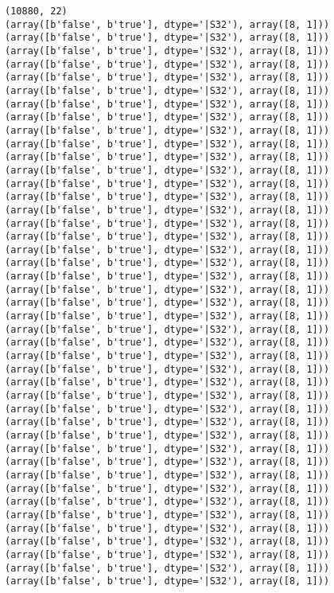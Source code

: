 \documentclass[11pt]{article}
\begin{document}
    \begin{Verbatim}[commandchars=\\\{\}]
(10880, 22)
(array([b'false', b'true'], dtype='|S32'), array([8, 1]))
(array([b'false', b'true'], dtype='|S32'), array([8, 1]))
(array([b'false', b'true'], dtype='|S32'), array([8, 1]))
(array([b'false', b'true'], dtype='|S32'), array([8, 1]))
(array([b'false', b'true'], dtype='|S32'), array([8, 1]))
(array([b'false', b'true'], dtype='|S32'), array([8, 1]))
(array([b'false', b'true'], dtype='|S32'), array([8, 1]))
(array([b'false', b'true'], dtype='|S32'), array([8, 1]))
(array([b'false', b'true'], dtype='|S32'), array([8, 1]))
(array([b'false', b'true'], dtype='|S32'), array([8, 1]))
(array([b'false', b'true'], dtype='|S32'), array([8, 1]))
(array([b'false', b'true'], dtype='|S32'), array([8, 1]))
(array([b'false', b'true'], dtype='|S32'), array([8, 1]))
(array([b'false', b'true'], dtype='|S32'), array([8, 1]))
(array([b'false', b'true'], dtype='|S32'), array([8, 1]))
(array([b'false', b'true'], dtype='|S32'), array([8, 1]))
(array([b'false', b'true'], dtype='|S32'), array([8, 1]))
(array([b'false', b'true'], dtype='|S32'), array([8, 1]))
(array([b'false', b'true'], dtype='|S32'), array([8, 1]))
(array([b'false', b'true'], dtype='|S32'), array([8, 1]))
(array([b'false', b'true'], dtype='|S32'), array([8, 1]))
(array([b'false', b'true'], dtype='|S32'), array([8, 1]))
(array([b'false', b'true'], dtype='|S32'), array([8, 1]))
(array([b'false', b'true'], dtype='|S32'), array([8, 1]))
(array([b'false', b'true'], dtype='|S32'), array([8, 1]))
(array([b'false', b'true'], dtype='|S32'), array([8, 1]))
(array([b'false', b'true'], dtype='|S32'), array([8, 1]))
(array([b'false', b'true'], dtype='|S32'), array([8, 1]))
(array([b'false', b'true'], dtype='|S32'), array([8, 1]))
(array([b'false', b'true'], dtype='|S32'), array([8, 1]))
(array([b'false', b'true'], dtype='|S32'), array([8, 1]))
(array([b'false', b'true'], dtype='|S32'), array([8, 1]))
(array([b'false', b'true'], dtype='|S32'), array([8, 1]))
(array([b'false', b'true'], dtype='|S32'), array([8, 1]))
(array([b'false', b'true'], dtype='|S32'), array([8, 1]))
(array([b'false', b'true'], dtype='|S32'), array([8, 1]))
(array([b'false', b'true'], dtype='|S32'), array([8, 1]))
(array([b'false', b'true'], dtype='|S32'), array([8, 1]))
(array([b'false', b'true'], dtype='|S32'), array([8, 1]))
(array([b'false', b'true'], dtype='|S32'), array([8, 1]))
(array([b'false', b'true'], dtype='|S32'), array([8, 1]))
(array([b'false', b'true'], dtype='|S32'), array([8, 1]))
(array([b'false', b'true'], dtype='|S32'), array([8, 1]))

\end{Verbatim}
\end{document}
